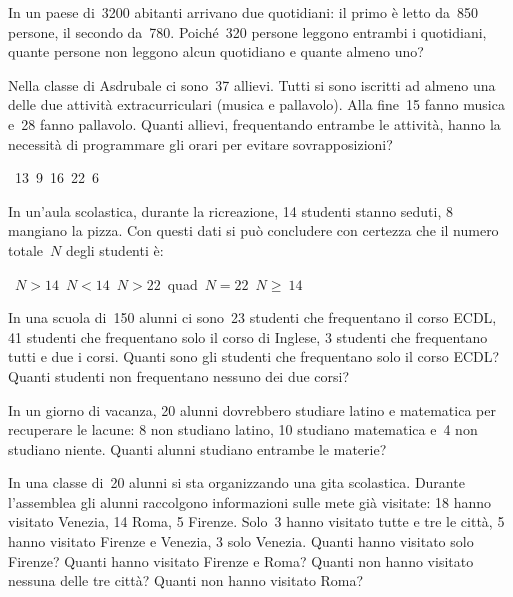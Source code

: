 \begin{multicols}{2}
\begin{esercizio}
\label{ese:7.33}
In un paese di~3200 abitanti arrivano due quotidiani: il primo è letto da~850
persone, il secondo da~780. Poiché~320 persone leggono entrambi i
quotidiani, quante persone non leggono alcun quotidiano e quante almeno uno?
\end{esercizio}

\begin{esercizio}
\label{ese:7.34}
Nella classe di Asdrubale ci sono~37 allievi. Tutti si sono iscritti
ad almeno una delle due attività extracurriculari (musica e
pallavolo). Alla fine~15 fanno musica e~28 fanno pallavolo.
Quanti allievi, frequentando entrambe le attività, hanno la
necessità di programmare gli orari per evitare sovrapposizioni?
\begin{center}
 \boxA~13\quad\boxB~9\quad\boxC~16\quad\boxD~22\quad\boxE~6
\end{center}
\end{esercizio}

\begin{esercizio}
\label{ese:7.35}
In un'aula scolastica, durante la ricreazione, 14
studenti stanno seduti, 8 mangiano la pizza. Con questi dati si può
concludere con certezza che il numero totale~\(N\) degli studenti è:
\begin{center}
 
\boxA\quad~\(N>14\)\quad\boxB\quad~\(N<14\)\quad\boxC\quad~\(N>22\)\quad\boxD{}~\(N 
= 22\)\quad\boxE\quad~\(N\geqslant~14\)
\end{center}
\end{esercizio}

\begin{esercizio}
\label{ese:7.36}
In una scuola di~150 alunni ci sono~23 studenti che frequentano il corso 
ECDL, 
41 studenti che frequentano solo il corso di Inglese, 3
studenti che frequentano tutti e due i corsi. Quanti sono gli studenti che 
frequentano solo il corso ECDL? Quanti studenti non frequentano
nessuno dei due corsi?
\end{esercizio}

\begin{esercizio}
\label{ese:7.37}
In un giorno di vacanza, 20 alunni dovrebbero studiare latino e
matematica per recuperare le lacune: 8 non studiano latino, 10 studiano
matematica e~4 non studiano niente. Quanti alunni studiano entrambe le
materie?
\end{esercizio}

\begin{esercizio}
\label{ese:7.38}
In una classe di~20 alunni si sta organizzando una gita
scolastica. Durante l'assemblea gli alunni raccolgono
informazioni sulle mete già visitate: 18 hanno visitato Venezia, 14
Roma, 5 Firenze. Solo~3 hanno visitato tutte e tre le città, 5 hanno
visitato Firenze e Venezia, 3 solo Venezia. Quanti hanno visitato solo
Firenze? Quanti hanno visitato Firenze e Roma? Quanti non hanno
visitato nessuna delle tre città? Quanti non hanno visitato Roma?
\end{esercizio}
\end{multicols}

